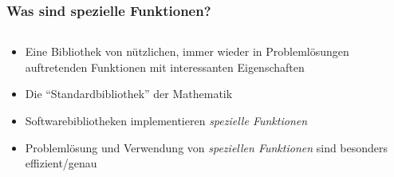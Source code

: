 %
%
%
\bgroup
\begin{frame}[t]
\setlength{\abovedisplayskip}{5pt}
\setlength{\belowdisplayskip}{5pt}
\frametitle{Was sind spezielle Funktionen?}
\vspace{-20pt}
\begin{columns}[t,onlytextwidth]
\begin{column}{0.48\textwidth}
\begin{itemize}
\item
Eine Bibliothek von nützlichen, immer wieder in Problemlösungen
auftretenden Funktionen mit interessanten Eigenschaften
\item<2->
Die ``Standardbibliothek'' der Mathematik
\item<3->
Softwarebibliotheken implementieren {\em spezielle Funktionen}
\item<4->
Problemlösung und Verwendung von {\em speziellen Funktionen}
sind
besonders effizient/genau
\end{itemize}
\end{column}
\begin{column}{0.48\textwidth}
\end{column}
\end{columns}
\end{frame}
\egroup

